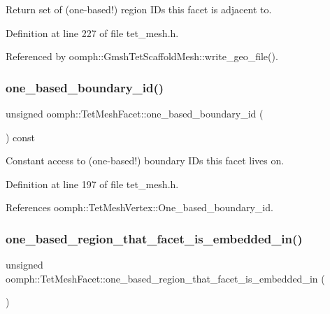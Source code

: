 Return set of (one-\/based!) region I\+Ds this facet is adjacent to. 



Definition at line 227 of file tet\+\_\+mesh.\+h.



Referenced by oomph\+::\+Gmsh\+Tet\+Scaffold\+Mesh\+::write\+\_\+geo\+\_\+file().

\mbox{\label{classoomph_1_1TetMeshFacet_a77738b43364fd6f1196e47928f57de65}} 
\subsubsection{\texorpdfstring{one\+\_\+based\+\_\+boundary\+\_\+id()}{one\_based\_boundary\_id()}}
{\footnotesize\ttfamily unsigned oomph\+::\+Tet\+Mesh\+Facet\+::one\+\_\+based\+\_\+boundary\+\_\+id (\begin{DoxyParamCaption}{ }\end{DoxyParamCaption}) const\hspace{0.3cm}{\ttfamily [inline]}}



Constant access to (one-\/based!) boundary I\+Ds this facet lives on. 



Definition at line 197 of file tet\+\_\+mesh.\+h.



References oomph\+::\+Tet\+Mesh\+Vertex\+::\+One\+\_\+based\+\_\+boundary\+\_\+id.

\mbox{\label{classoomph_1_1TetMeshFacet_acbceefd4c9afbd31c0a163e7a008e6e4}} 
\subsubsection{\texorpdfstring{one\+\_\+based\+\_\+region\+\_\+that\+\_\+facet\+\_\+is\+\_\+embedded\+\_\+in()}{one\_based\_region\_that\_facet\_is\_embedded\_in()}}
{\footnotesize\ttfamily unsigned oomph\+::\+Tet\+Mesh\+Facet\+::one\+\_\+based\+\_\+region\+\_\+that\+\_\+facet\+\_\+is\+\_\+embedded\+\_\+in (\begin{DoxyParamCaption}{ }\end{DoxyParamCaption})\hspace{0.3cm}{\ttfamily [inline]}}

